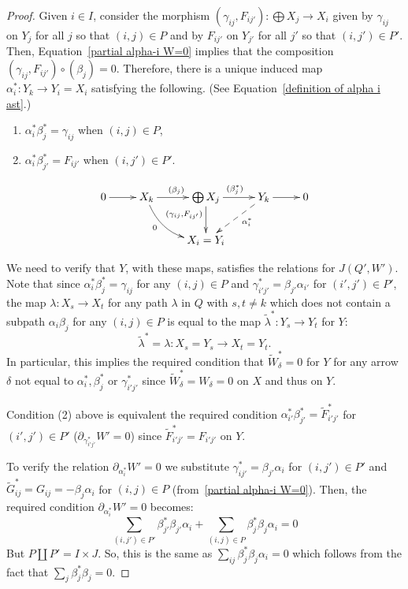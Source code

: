 \documentclass[ALCO,ThmDefs,Unicode,epreuves]{cedram}
\begin{document}
\begin{proof}
Given $i\in I$, consider the morphism ${(\gamma_{ij},F_{ij'})}:\bigoplus X_j\to X_i$ given by $\gamma_{ij}$ on $Y_j$ for all $j$ so that $(i,j)\in P$ and by $F_{ij'}$ on $Y_{j'}$ for all $j'$ so that $(i,j')\in P'$. Then, Equation~\eqref{partial alpha-i W=0} implies that the composition ${(\gamma_{ij},F_{ij'})}\circ (\beta_j)=0$. Therefore, there is a unique induced map $\alpha_i^\ast:Y_k\to Y_i=X_i$ satisfying the following. (See Equation~\eqref{definition of alpha i ast}.)
\begin{enumerate}
\item\label{proof_lemma2.11_1} $\alpha_i^\ast \beta_j^\ast=\gamma_{ij}$ when $(i,j)\in P$,
\item\label{proof_lemma2.11_2} $\alpha_i^\ast \beta_{j'}^\ast=F_{ij'}$ when $(i,j')\in P'$.
\end{enumerate}
\begin{equation}\label{definition of alpha i ast}
\xymatrix{%
0 \ar[r] &
	X_k\ar@/_1pc/[rd]_(.35)0\ar[r]^{(\beta_j)} &
	\bigoplus X_j\ar[d]_(.4){(\gamma_{ij},F_{ij'})}\ar[r]^{(\beta_j^\ast)}&
Y_k \ar[r]\ar@{-->}[dl]^(.4){\alpha_i^\ast}& 0\\
 &  & X_i=Y_i &  
	}%
\end{equation}

We need to verify that $Y$, with these maps, satisfies the relations for $J(Q',W')$. Note that since $\alpha_i^\ast \beta_j^\ast=\gamma_{ij}$ for any $(i,j)\in P$ and $\gamma_{i'j'}^\ast= \beta_{j'}\alpha_{i'}$ for $(i',j')\in P'$, the map $\lambda:X_s\to X_t$ for any path $\lambda$ in $Q$ with $s,t\neq k$ which does not contain a subpath $\alpha_i \beta_j$ for any $(i,j)\in P$ is equal to the map $\widetilde\lambda^\ast:Y_s\to Y_t$ for $Y$:
\[
	\widetilde\lambda^\ast=\lambda:X_s=Y_s\to X_t=Y_t.
\]
In particular, this implies the required condition that $\widetilde W_\delta^\ast=0$ for $Y$ for any arrow $\delta$ not equal to $\alpha_i^\ast,\beta_j^\ast$ or $\gamma_{i'j'}^\ast$ since $\widetilde W_\delta^\ast=W_\delta=0$ on $X$ and thus on $Y$.

Condition (2) above is equivalent the required condition $\alpha_{i'}^\ast \beta_{j'}^\ast=\widetilde F^\ast_{i'j'}$ for $(i',j')\in P'$ ($\partial_{\gamma_{i'j'}^\ast}W'=0$) since $\widetilde F^\ast_{i'j'}= F_{i'j'}$ on $Y$.

To verify the relation $\partial_{\alpha_i^\ast}W'=0$ we substitute $\gamma_{ij'}^\ast=\beta_{j'}\alpha_i$ for $(i,j')\in P'$ and $\widetilde G_{ij}^\ast=G_{ij}=-\beta_j\alpha_i$ for $(i,j)\in P$ (from~\eqref{partial alpha-i W=0}). Then, the required condition $\partial_{\alpha_i^\ast}W'=0$ becomes:
\[
	\sum_{(i,j')\in P'}\beta_{j'}^\ast\beta_{j'}\alpha_i+\sum_{(i,j)\in P}\beta_j^\ast\beta_j\alpha_i=0
\]
But $P\coprod P'=I\times J$. So, this is the same as $\sum_{ij} \beta_j^\ast\beta_j\alpha_i=0$ which follows from the fact that $\sum_j\beta_j^\ast\beta_j=0$.


\end{proof}
\end{document}
